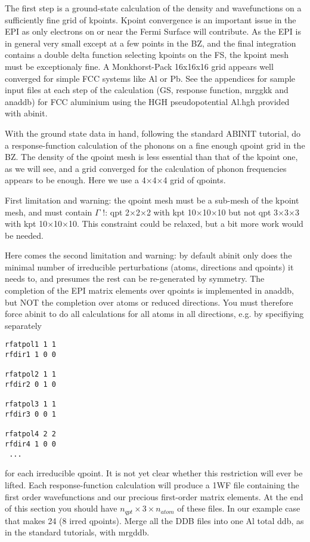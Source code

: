 \documentclass[aps,preprint]{revtex4}
\begin{document}
The first step is a ground-state calculation of the density and wavefunctions
on a sufficiently fine grid of kpoints. Kpoint convergence is an important
issue in the EPI as only electrons on or near the Fermi Surface will
contribute. As the EPI is in general very small except at a few points in the
BZ, and the final integration contains a double delta function selecting
kpoints on the FS, the kpoint mesh must be exceptionaly fine. A Monkhorst-Pack
16x16x16 grid appears well converged for simple FCC systems like Al or Pb. See
the appendices for sample input files at each step of the calculation (GS,
response function, mrggkk and anaddb) for FCC aluminium using the HGH
pseudopotential Al.hgh provided with abinit.


With the ground state data in hand, following the standard ABINIT tutorial, do
a response-function calculation of the phonons on a fine enough qpoint grid in
the BZ. The density of the qpoint mesh is less essential than that of the
kpoint one, as we will see, and a grid converged for the calculation of phonon
frequencies appears to be enough. Here we use a 4$\times$4$\times$4 grid of qpoints.

First limitation and warning: the qpoint mesh must be a sub-mesh of the kpoint
mesh, and must contain $\Gamma$ !: qpt 2$\times$2$\times$2 with kpt
10$\times$10$\times$10 but not qpt 3$\times$3$\times$3 with kpt
10$\times$10$\times$10. This constraint could be relaxed, but a bit more work
would be needed.

Here comes the second limitation and warning: by default abinit only does the
minimal number of irreducible perturbations (atoms, directions and qpoints) it
needs to, and presumes the rest can be re-generated by symmetry. The
completion of the EPI matrix elements over qpoints is implemented in anaddb,
but NOT the completion over atoms or reduced directions. You must therefore
force abinit to do all calculations for all atoms in all directions, e.g. by
specifiying separately

\begin{verbatim}
rfatpol1 1 1
rfdir1 1 0 0

rfatpol2 1 1
rfdir2 0 1 0

rfatpol3 1 1
rfdir3 0 0 1

rfatpol4 2 2
rfdir4 1 0 0
 ...
\end{verbatim}

for each irreducible qpoint. It is not yet clear whether this restriction will
ever be lifted. Each response-function calculation will produce a 1WF file
containing the first order wavefunctions and our precious first-order matrix
elements. At the end of this section you should have $n_{qpt} \times 3 \times
n_{atom}$ of these files. In our example case that makes 24 (8 irred qpoints).
Merge all the DDB files into one Al total ddb, as in the standard tutorials,
with mrgddb.
\end{document}

